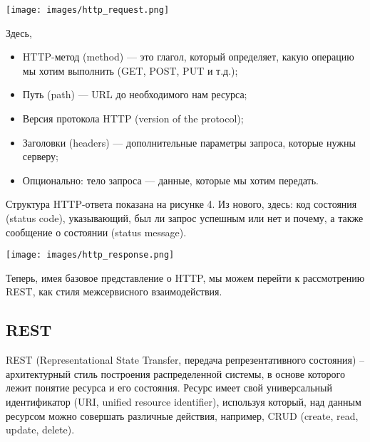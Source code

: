          \noindent\begin{minipage}[t]{\textwidth}
             \begin{center}
             \texttt{[image: images/http\_request.png]}
             \end{center} \label{fig:Moreno}
        \end{minipage}
        Здесь,
         \begin{itemize}
             \item HTTP-метод (method) — это глагол, который определяет, какую операцию мы хотим выполнить (GET, POST, PUT и т.д.);
             \item Путь (path) — URL до необходимого нам ресурса;
             \item Версия протокола HTTP (version of the protocol);
             \item Заголовки (headers) — дополнительные параметры запроса, которые нужны серверу;
             \item Опционально: тело запроса — данные, которые мы хотим передать. 
         \end{itemize}
        
        Структура HTTP-ответа показана на рисунке 4. Из нового, здесь: код состояния (status code), указывающий, был ли запрос успешным или нет и почему, а также сообщение о состоянии (status message).

        \noindent\begin{minipage}[t]{\textwidth}
             \begin{center}
             \texttt{[image: images/http\_response.png]}
             \end{center} \label{fig:Moreno}
        \end{minipage}
        

        Теперь, имея базовое представление о HTTP, мы можем перейти к рассмотрению REST, как стиля межсервисного взаимодействия. 

        \subsection{REST} 

        REST (Representational State Transfer, передача репрезентативного
    состояния) – архитектурный стиль построения распределенной системы, в основе которого лежит понятие ресурса и его состояния. Ресурс имеет свой универсальный идентификатор (URI, unified resource identifier), используя который, над данным ресурсом можно совершать различные действия, например,
    CRUD (create, read, update, delete). \cite{rest_soap} \label{REST}

